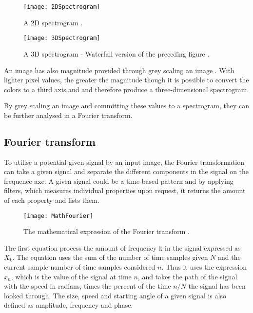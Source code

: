 \begin{figure}[!h]
\centering
\texttt{[image: 2DSpectrogram]}
\caption{\label{fig:2DSpectrogram} A 2D spectrogram \cite{steilglitz1997digital}.}
\end{figure}

\begin{figure}[!h]
\centering
\texttt{[image: 3DSpectrogram]}
\caption{\label{fig:3DSpectrogram} A 3D spectrogram - Waterfall version of the preceding figure \cite{steilglitz1997digital}.}
\end{figure}

An image has also magnitude provided through grey scaling an image \cite{Izotope2014}. With lighter pixel values, the greater the magnitude though it is possible to convert the colors to a third axis and and therefore produce a three-dimensional spectrogram.

By grey scaling an image and committing these values to a spectrogram, they can be further analysed in a Fourier transform.  

\subsection{Fourier transform}\label{sub:fourier}

To utilise a potential given signal by an input image, the Fourier transformation can take a given signal and separate the different components in the signal on the frequence axe. A given signal could be a time-based pattern and by applying filters, which measures individual properties upon request, it returns the amount of each property and lists them. 

\begin{figure}
\centering
\texttt{[image: MathFourier]}
\caption{The mathematical expression of the Fourier transform \cite{MathFourier2013}.}
\end{figure}

The first equation process the amount of frequency k in the signal expressed as \(X_k\). The equation uses the sum of the number of time samples given \(N\) and the current sample number of time samples considered \(n\). Thus it uses the expression \(x_n\), which is the value of the signal at time \(n\), and takes the path of the signal with the speed in radians, times the percent of the time \(n/N\) the signal has been looked through. The size, speed and starting angle of a given signal is also defined as amplitude, frequency and phase.      

